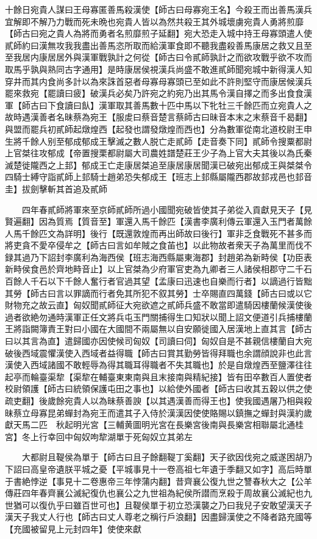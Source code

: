 十餘日宛貴人謀曰王母寡匿善馬殺漢使【師古曰母寡宛王名】今殺王而出善馬漢兵宜解即不解乃力戰而死未晩也宛貴人皆以為然共殺王其外城壞虜宛貴人勇將煎靡【師古曰宛之貴人為將而勇者名煎靡煎子延翻】宛大恐走入城中持王母寡頭遣人使貳師約曰漢無攻我我盡出善馬恣所取而給漢軍食即不聽我盡殺善馬康居之救又且至至我居内康居居外與漢軍戰孰計之何從【師古曰令貳師孰計之而欲攻戰乎欲不攻而取馬乎孰與熟同古字通用】是時康居侯視漢兵尚盛不敢進貳師聞宛城中新得漢人知穿井而其内食尚多計以為來誅首惡者母寡母寡頭已至如此不許則堅守而康居候漢兵罷來救宛【罷讀曰疲】破漢兵必矣乃許宛之約宛乃出其馬令漢自擇之而多出食食漢軍【師古曰下食讀曰飤】漢軍取其善馬數十匹中馬以下牝牡三千餘匹而立宛貴人之故時遇漢善者名昧蔡為宛王【服䖍曰蔡音楚言蔡師古曰昧音本末之末蔡音千曷翻】與盟而罷兵初貳師起燉煌西【起發也謂發燉煌而西也】分為數軍從南北道校尉王申生將千餘人别至郁成郁成王擊滅之數人脱亡走貳師【走音奏下同】貳師令搜粟都尉上官桀往攻郁成【帝置搜栗都尉屬大司農姓譜楚莊王少子為上官大夫其後以為氏秦滅楚徙隴西之上邽】郁成王亡走康居桀追至康居康居聞漢已破宛出郁成王與桀桀令四騎士縛守詣貳師上邽騎士趙弟恐失郁成王【班志上邽縣屬隴西郡故邽戎邑也邽音圭】拔劍擊斬其首追及貳師

　　四年春貳師將軍來至京師貳師所過小國聞宛破皆使其子弟從入貢獻見天子【見賢遍翻】因為質焉【質音至】軍還入馬千餘匹【漢書李廣利傳云軍還入玉門者萬餘人馬千餘匹文為詳明】後行【既還敦煌而再出師故曰後行】軍非乏食戰死不甚多而將吏貪不愛卒侵牟之【師古曰言如牟賊之食苖也】以此物故者衆天子為萬里而伐不録其過乃下詔封李廣利為海西侯【班志海西縣屬東海郡】封趙弟為新畤侯【功臣表新畤侯食邑於齊地畤音止】以上官桀為少府軍官吏為九卿者三人諸侯相郡守二千石百餘人千石以下千餘人奮行者官過其望【孟康曰迅速也自樂而行者】以謫過行皆黜其勞【師古曰言以罪謫而行者免其所犯不叙其勞】士卒賜直四萬錢【師古曰或以它財物充之故云直】匈奴聞貳師征大宛欲遮之貳師兵盛不敢當即遣騎因樓蘭候漢使後過者欲絶勿通時漢軍正任文將兵屯玉門關捕得生口知狀以聞上詔文便道引兵捕樓蘭王將詣闕簿責王對曰小國在大國間不兩屬無以自安願徙國入居漢地上直其言【師古曰以其言為直】遣歸國亦因使候司匈奴【司讀曰伺】匈奴自是不甚親信樓蘭自大宛破後西域震懼漢使入西域者益得職【師古曰賞其勤勞皆得拜職也余謂顔說非也此言漢使入西域諸國不敢輕辱為得其職耳得職者不失其職也】於是自燉煌西至鹽澤往往起亭而輪臺渠犂【渠犂在輔臺東東南與且末接南與精紀接】皆有田卒數百人置使者校尉領護【師古曰統領保護屯田之事也】以給使外國者【師古曰收其五穀以供之使疏吏翻】後歲餘宛貴人以為昧蔡善諛【以其遇漢善而得王也】使我國遇屠乃相與殺昧蔡立母寡昆弟蟬封為宛王而遣其子入侍於漢漢因使使賂賜以鎮撫之蟬封與漢約歲獻天馬二匹　秋起明光宮【三輔黄圖明光宮在長樂宮後南與長樂宮相聯屬北通桂宮】冬上行幸回中匈奴呴犂湖單于死匈奴立其弟左

　　大都尉且鞮侯為單于【師古曰且子餘翻鞮丁奚翻】天子欲因伐宛之威遂困胡乃下詔曰高皇帝遺朕平城之憂【平城事見十一卷高祖七年遺于季翻又如字】高后時單于書絶悖逆【事見十二卷惠帝三年悖蒲内翻】昔齊襄公復九世之讐春秋大之【公羊傳莊四年春齊襄公滅紀復仇也襄公之九世祖為紀侯所譛而烹殺于周故襄公滅紀也九世猶可以復仇乎曰雖百世可也】且鞮侯單于初立恐漢襲之乃曰我兒子安敢望漢天子漢天子我丈人行也【師古曰丈人尊老之稱行戶浪翻】因盡歸漢使之不降者路充國等【充國被留見上元封四年】使使來獻

